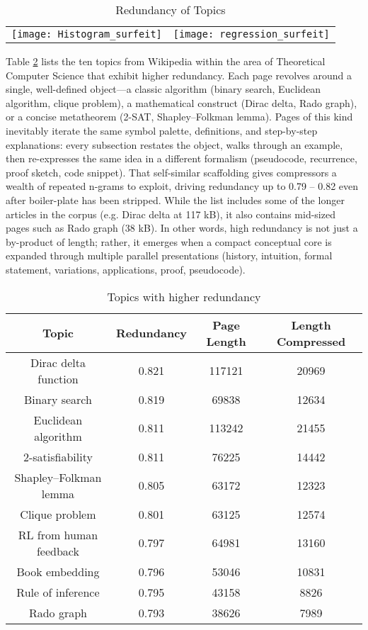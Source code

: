 \begin{table}
\begin{centering}
\begin{tabular}{c c}
\texttt{[image: Histogram\_surfeit]}
&
\texttt{[image: regression\_surfeit]}\tabularnewline
\end{tabular}
\par\end{centering}
\caption{\label{fig:Surfeit-of-Topics}Redundancy of Topics}
\end{table}

Table \ref{tab:Higher-redundancy-of-topics} lists the ten topics from Wikipedia within the area of Theoretical Computer Science that exhibit higher redundancy. Each page revolves around a single, well-defined object—a classic algorithm (binary search, Euclidean algorithm, clique problem), a mathematical construct (Dirac delta, Rado graph), or a concise metatheorem (2-SAT, Shapley–Folkman lemma). Pages of this kind inevitably iterate the same symbol palette, definitions, and step-by-step explanations: every subsection restates the object, walks through an example, then re-expresses the same idea in a different formalism (pseudocode, recurrence, proof sketch, code snippet). That self-similar scaffolding gives compressors a wealth of repeated n-grams to exploit, driving redundancy up to 0.79 – 0.82 even after boiler-plate has been stripped. While the list includes some of the longer articles in the corpus (e.g. Dirac delta at 117 kB), it also contains mid-sized pages such as Rado graph (38 kB). In other words, high redundancy is not just a by-product of length; rather, it emerges when a compact conceptual core is expanded through multiple parallel presentations (history, intuition, formal statement, variations, applications, proof, pseudocode).

\begin{table}
\begin{centering}
\begin{tabular}{|c|c|c|c|}
\hline 
Topic & Redundancy & Page Length & Length Compressed \tabularnewline
\hline 
\hline 
Dirac delta function & 0.821 & 117121 & 20969 \tabularnewline
\hline
Binary search & 0.819 & 69838 & 12634 \tabularnewline
\hline
Euclidean algorithm & 0.811 & 113242 & 21455 \tabularnewline
\hline
2-satisfiability & 0.811 & 76225 & 14442 \tabularnewline
\hline
Shapley–Folkman lemma & 0.805 & 63172 & 12323 \tabularnewline
\hline
Clique problem & 0.801 & 63125 & 12574 \tabularnewline
\hline
RL from human feedback & 0.797 & 64981 & 13160 \tabularnewline
\hline
Book embedding & 0.796 & 53046 & 10831 \tabularnewline
\hline
Rule of inference & 0.795 & 43158 & 8826 \tabularnewline
\hline
Rado graph & 0.793 & 38626 & 7989 \tabularnewline
\hline 
\end{tabular}
\par\end{centering}
\caption{\label{tab:Higher-redundancy-of-topics}Topics with higher redundancy}
\end{table}

